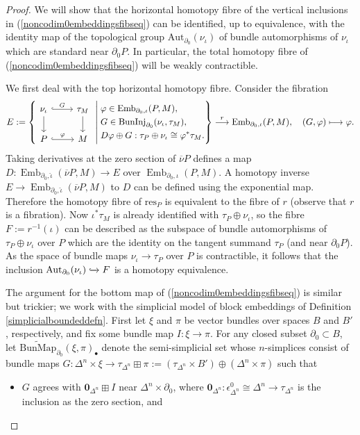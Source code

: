 \documentclass[a4paper, oneside]{amsart}
\newcommand{\emb}{\operatorname{Emb}}
\newcommand{\1}{\mathds{1}}
\theoremstyle{remark}
\theoremstyle{definition}
\numberwithin{equation}{section}
\begin{document}
\begin{proof}
    We will show that the horizontal homotopy fibre of the vertical inclusions in (\ref{noncodim0embeddingsfibseq}) can be identified, up to equivalence, with the identity map of the topological group $\mathrm{Aut}_{\partial_0}(\nu_\iota)$ of bundle automorphisms of $\nu_\iota$ which are standard near $\partial_0P$. In particular, the total homotopy fibre of (\ref{noncodim0embeddingsfibseq}) will be weakly contractible.
    
    We first deal with the top horizontal homotopy fibre. Consider the fibration
    $$
E:=\left\{\begin{tikzcd}
    \nu_{\iota}\rar[hook, "G"]\dar & \tau_M\dar\\
    P\rar[hook, "\varphi"] &M
\end{tikzcd}\;\middle|\;
\begin{aligned}
    &\varphi\in\emb_{\partial_0,\iota}(P,M),\\
    &G\in \operatorname{BunInj}_{\partial_0}(\nu_\iota,\tau_M),\\
    &D\varphi\oplus G: \tau_P\oplus\nu_{\iota}\cong \varphi^*\tau_M.
\end{aligned}
\right\}\overset{r}\longrightarrow \emb_{\partial_0,\iota}(P,M),\quad (G,\varphi)\longmapsto \varphi.
    $$
    Taking derivatives at the zero section of $\overline{\nu}P$ defines a map $D: \emb_{\partial_0,\hat\iota}(\overline{\nu}P,M)\to E$ over $\emb_{\partial_0,\iota}(P,M)$. A homotopy inverse $E\to \emb_{\partial_0,\hat\iota}(\overline{\nu}P,M)$ to $D$ can be defined using the exponential map. Therefore the homotopy fibre of $\mathrm{res}_P$ is equivalent to the fibre of $r$ (observe that $r$ is a fibration). Now $\iota^*\tau_M$ is already identified with $\tau_P\oplus\nu_\iota$, so the fibre $F:=r^{-1}(\iota)$ can be described as the subspace of bundle automorphisms of $\tau_P\oplus\nu_\iota$ over $P$ which are the identity on the tangent summand $\tau_P$ (and near $\partial_0P$). As the space of bundle maps $\nu_\iota\to\tau_P$ over $P$ is contractible, it follows that the inclusion $\mathrm{Aut}_{\partial_0}(\nu_\iota)\xhookrightarrow{}F$ is a homotopy equivalence.

    The argument for the bottom map of (\ref{noncodim0embeddingsfibseq}) is similar but trickier; we work with the simplicial model of block embeddings of Definition \ref{simplicialboundeddefn}. First let $\xi$ and $\pi$ be vector bundles over spaces $B$ and $B'$, respectively, and fix some bundle map $I: \xi\to \pi$. For any closed subset $\partial_0\subset B$, let $\operatorname{\widetilde{BunMap}}_{\partial_0}(\xi,\pi)_\bullet$ denote the semi-simplicial set whose $n$-simplices consist of bundle maps $G:\Delta^n\times \xi\to \tau_{\Delta^n}\boxplus \pi:=(\tau_{\Delta^n}\times B')\oplus (\Delta^n\times \pi)$ such that 
    \begin{itemize}
        \item $G$ agrees with $\mathbf{0}_{\Delta^n}\boxplus I$ near $\Delta^n\times\partial_0$, where $\mathbf{0}_{\Delta^n}: \epsilon^0_{\Delta^n}\cong \Delta^n\to \tau_{\Delta^n}$ is the inclusion as the zero section, and


\end{itemize}
\end{proof}
\end{document}

